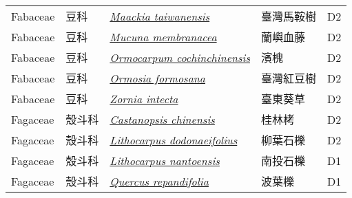 {\begin{longtable}{L{2.5cm}L{2cm}L{5cm}L{2.5cm}L{3cm}}
    Fabaceae & 豆科 & \href{http://www.theplantlist.org/tpl1.1/search?q=Maackia+taiwanensis}{\textit{Maackia taiwanensis} } & 臺灣馬鞍樹 & D2    \\
    Fabaceae & 豆科 & \href{http://www.theplantlist.org/tpl1.1/search?q=Mucuna+membranacea}{\textit{Mucuna membranacea} } & 蘭嶼血藤 & D2    \\
    Fabaceae & 豆科 & \href{http://www.theplantlist.org/tpl1.1/search?q=Ormocarpum+cochinchinensis}{\textit{Ormocarpum cochinchinensis} } & 濱槐 & D2    \\
    Fabaceae & 豆科 & \href{http://www.theplantlist.org/tpl1.1/search?q=Ormosia+formosana}{\textit{Ormosia formosana} } & 臺灣紅豆樹 & D2    \\
    Fabaceae & 豆科 & \href{http://www.theplantlist.org/tpl1.1/search?q=Zornia+intecta}{\textit{Zornia intecta} } & 臺東葵草 & D2    \\
    Fagaceae & 殼斗科 & \href{http://www.theplantlist.org/tpl1.1/search?q=Castanopsis+chinensis}{\textit{Castanopsis chinensis} } & 桂林栲 & D2    \\
    Fagaceae & 殼斗科 & \href{http://www.theplantlist.org/tpl1.1/search?q=Lithocarpus+dodonaeifolius}{\textit{Lithocarpus dodonaeifolius} } & 柳葉石櫟 & D2    \\
    Fagaceae & 殼斗科 & \href{http://www.theplantlist.org/tpl1.1/search?q=Lithocarpus+nantoensis}{\textit{Lithocarpus nantoensis} } & 南投石櫟 & D1    \\
    Fagaceae & 殼斗科 & \href{http://www.theplantlist.org/tpl1.1/search?q=Quercus+repandifolia}{\textit{Quercus repandifolia} } & 波葉櫟 & D1    \\

\end{longtable}}
